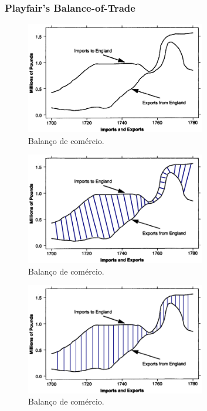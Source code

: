 \begin{frame}[allowframebreaks]
\frametitle{Playfair's Balance-of-Trade}

\begin{figure}[h]
 \centering
  \includegraphics[width=0.7\textwidth,height=0.6\textheight,keepaspectratio]{figures/imports-exports.png}
 \caption{Balanço de comércio.}
 \label{fig-importex1}
\end{figure}

\framebreak

\begin{figure}[h]
 \centering
  \includegraphics[width=0.7\textwidth,height=0.6\textheight,keepaspectratio]{figures/imports-exports_a.png}
 \caption{Balanço de comércio.}
 \label{fig-importex1a}
\end{figure}

\framebreak

\begin{figure}[h]
 \centering
  \includegraphics[width=0.7\textwidth,height=0.6\textheight,keepaspectratio]{figures/imports-exports_b.png}
 \caption{Balanço de comércio.}
 \label{fig-importex1b}
\end{figure}


\end{frame}

